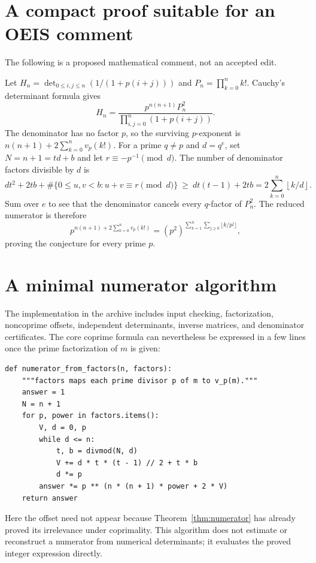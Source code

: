 \documentclass[11pt,a4paper]{article}
\numberwithin{equation}{section}
\theoremstyle{definition}
\theoremstyle{remark}
\newcommand{\floor}[1]{\left\lfloor#1\right\rfloor}
\begin{document}
\appendix
\section{A compact proof suitable for an OEIS comment}\label{app:comment}
The following is a proposed mathematical comment, not an accepted edit.

Let $H_n=\det_{0\leq i,j\leq n}(1/(1+p(i+j)))$ and $P_n=\prod_{k=0}^n k!$. Cauchy's determinant formula gives
\[
 H_n=\frac{p^{n(n+1)}P_n^2}{\prod_{i,j=0}^n(1+p(i+j))}.
\]
The denominator has no factor $p$, so the surviving $p$-exponent is
$n(n+1)+2\sum_{k=0}^n v_p(k!)$.
For a prime $q\neq p$ and $d=q^e$, set $N=n+1=td+b$ and let $r\equiv-p^{-1}\pmod d$. The number of denominator factors divisible by $d$ is
\[
 dt^2+2tb+\#\{0\leq u,v<b:u+v\equiv r\pmod d\}
 \ \geq\ dt(t-1)+2tb
 =2\sum_{k=0}^n\floor{k/d}.
\]
Sum over $e$ to see that the denominator cancels every $q$-factor of $P_n^2$. The reduced numerator is therefore
\[
 p^{n(n+1)+2\sum_{k=0}^n v_p(k!)}
 =(p^2)^{\sum_{k=1}^n\sum_{j\geq0}\lfloor k/p^j\rfloor},
\]
proving the conjecture for every prime $p$.

\section{A minimal numerator algorithm}\label{app:algorithm}
The implementation in the archive includes input checking, factorization, noncoprime offsets, independent determinants, inverse matrices, and denominator certificates. The core coprime formula can nevertheless be expressed in a few lines once the prime factorization of $m$ is given:
\begin{lstlisting}
def numerator_from_factors(n, factors):
    """factors maps each prime divisor p of m to v_p(m)."""
    answer = 1
    N = n + 1
    for p, power in factors.items():
        V, d = 0, p
        while d <= n:
            t, b = divmod(N, d)
            V += d * t * (t - 1) // 2 + t * b
            d *= p
        answer *= p ** (n * (n + 1) * power + 2 * V)
    return answer
\end{lstlisting}
Here the offset need not appear because Theorem~\ref{thm:numerator} has already proved its irrelevance under coprimality. This algorithm does not estimate or reconstruct a numerator from numerical determinants; it evaluates the proved integer expression directly.
\end{document}

